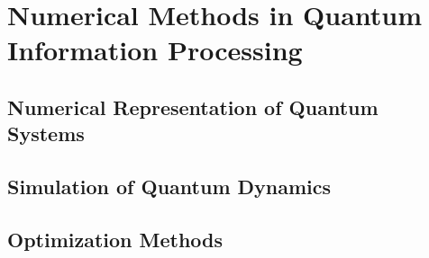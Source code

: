 \chapter{Numerical Methods in Quantum Information Processing}
\label{chap:numerics}

\section{Numerical Representation of Quantum Systems}

\section{Simulation of Quantum Dynamics}

\section{Optimization Methods}
